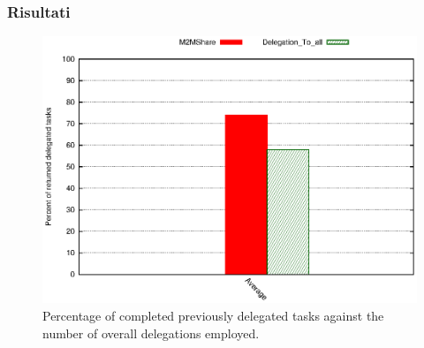 \documentclass{beamer}
\begin{document}
\begin{frame}
\frametitle{Risultati}
\begin{center}
\begin{figure}[ht]
\includegraphics[scale=0.7]{../grafici/percDeleghe.eps}
\caption{Percentage of completed previously delegated tasks against the number of overall delegations employed.}
\end{figure}
\end{center}
\end{frame}
\end{document}

